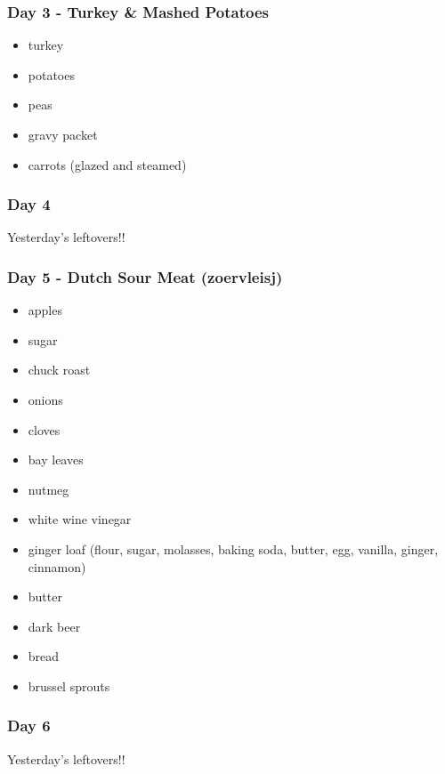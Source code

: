\documentclass[11pt, a4paper]{article}
\begin{document}
\subsubsection{Day 3 - Turkey \& Mashed Potatoes}
\vspace{1pc}
\begin{itemize}
\item turkey
\item potatoes
\item peas
\item gravy packet
\item carrots (glazed and steamed)
\end{itemize}

\subsubsection{Day 4}
\vspace{1pc}
Yesterday's leftovers!!

\subsubsection{Day 5 - Dutch Sour Meat (zoervleisj)} 
\vspace{1pc}
\begin{itemize}
\item apples
\item sugar 
\item chuck roast
\item onions 
\item cloves 
\item bay leaves 
\item nutmeg 
\item white wine vinegar 
\item ginger loaf (flour, sugar, molasses, baking soda, butter, egg, vanilla, ginger, cinnamon) 
\item butter 
\item dark beer 
\item bread 
\item brussel sprouts 
\end{itemize}

\subsubsection{Day 6}
\vspace{1pc}
Yesterday's leftovers!!
\end{document}
